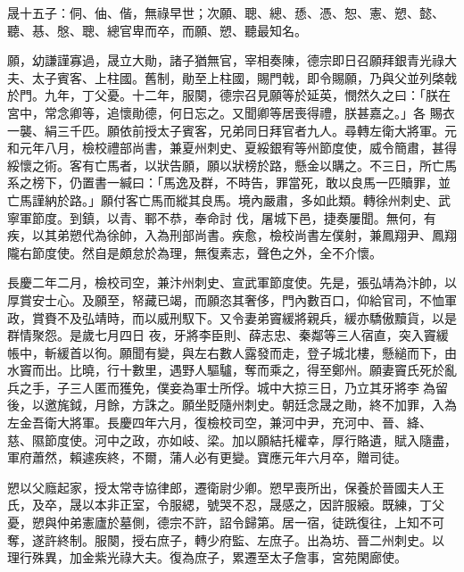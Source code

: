 \begin{pinyinscope}
 晟十五子：侗、伷、偕，無祿早世；次願、聰、總、愻、憑、恕、憲、愬、懿、聽、惎、慇、聰、總官卑而卒，而願、愬、聽最知名。



 願，幼謙謹寡過，晟立大勛，諸子猶無官，宰相奏陳，德宗即日召願拜銀青光祿大夫、太子賓客、上柱國。舊制，勛至上柱國，賜門戟，即令賜願，乃與父並列棨戟於門。九年，丁父憂。十二年，服闋，德宗召見願等於延英，憫然久之曰：「朕在宮中，常念卿等，追懷勛德，何日忘之。又聞卿等居喪得禮，朕甚嘉之。」各
 賜衣一襲、絹三千匹。願依前授太子賓客，兄弟同日拜官者九人。尋轉左衛大將軍。元和元年八月，檢校禮部尚書，兼夏州刺史、夏綏銀宥等州節度使，威令簡肅，甚得綏懷之術。客有亡馬者，以狀告願，願以狀榜於路，懸金以購之。不三日，所亡馬系之榜下，仍置書一緘曰：「馬逸及群，不時告，罪當死，敢以良馬一匹贖罪，並亡馬謹納於路。」願付客亡馬而縱其良馬。境內嚴肅，多如此類。轉徐州刺史、武寧軍節度。到鎮，以青、鄆不恭，奉命討
 伐，屠城下邑，捷奏屢聞。無何，有疾，以其弟愬代為徐帥，入為刑部尚書。疾愈，檢校尚書左僕射，兼鳳翔尹、鳳翔隴右節度使。然自是頗怠於為理，無復素志，聲色之外，全不介懷。



 長慶二年二月，檢校司空，兼汴州刺史、宣武軍節度使。先是，張弘靖為汴帥，以厚賞安士心。及願至，帑藏已竭，而願恣其奢侈，門內數百口，仰給官司，不恤軍政，賞賚不及弘靖時，而以威刑馭下。又令妻弟竇緩將親兵，緩亦驕傲黷貨，以是群情聚怨。是歲七月四日
 夜，牙將李臣則、薛志忠、秦鄰等三人宿直，突入竇緩帳中，斬緩首以徇。願聞有變，與左右數人露發而走，登子城北樓，懸縋而下，由水竇而出。比曉，行十數里，遇野人驅驢，奪而乘之，得至鄭州。願妻竇氏死於亂兵之手，子三人匿而獲免，僕妾為軍士所俘。城中大掠三日，乃立其牙將李為留後，以邀旄鉞，月餘，方誅之。願坐貶隨州刺史。朝廷念晟之勛，終不加罪，入為左金吾衛大將軍。長慶四年六月，復檢校司空，兼河中尹，充河中、晉、絳、
 慈、隰節度使。河中之政，亦如岐、梁。加以願結托權幸，厚行賂遺，賦入隨盡，軍府蕭然，賴遽疾終，不爾，蒲人必有更變。寶應元年六月卒，贈司徒。



 愬以父廕起家，授太常寺協律郎，遷衛尉少卿。愬早喪所出，保養於晉國夫人王氏，及卒，晟以本非正室，令服緦，號哭不忍，晟感之，因許服縗。既練，丁父憂，愬與仲弟憲廬於墓側，德宗不許，詔令歸第。居一宿，徒跣復往，上知不可奪，遂許終制。服闋，授右庶子，轉少府監、左庶子。出為坊、晉二州刺史。以
 理行殊異，加金紫光祿大夫。復為庶子，累遷至太子詹事，宮苑閑廊使。




\end{pinyinscope}
